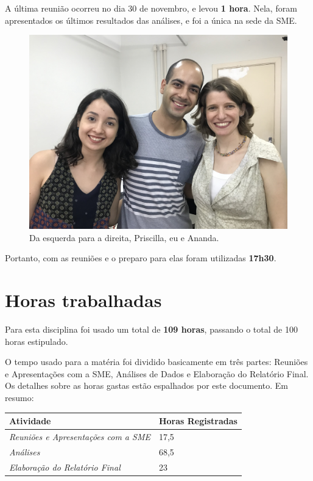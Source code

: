 \documentclass[12pt, a4paper]{article}
\begin{document}
A última reunião ocorreu no dia 30 de novembro, e levou \textbf{1 hora}. Nela, foram apresentados os últimos resultados das análises, e foi a única na sede da SME.

\begin{figure}[H]
	\centering
	\includegraphics[width=0.7\linewidth]{IMG_6634}
	\caption{Da esquerda para a direita, Priscilla, eu e Ananda.}
	\label{fig:img6634}
\end{figure}

Portanto, com as reuniões e o preparo para elas foram utilizadas \textbf{17h30}.

\section{Horas trabalhadas}

Para esta disciplina foi usado um total de \textbf{109 horas}, passando o total de 100 horas estipulado.

O tempo usado para a matéria foi dividido basicamente em três partes: Reuniões e Apresentações com a SME, Análises de Dados e Elaboração do Relatório Final. Os detalhes sobre as horas gastas estão espalhados por este documento. Em resumo:

\begin{table}[H]
	\centering
	\begin{tabular}{l|l}
		\textbf{Atividade}                                   & \textbf{Horas Registradas} \\ \hline
		\textit{Reuniões e Apresentações com a SME} & 17,5                          \\ \hline
		\textit{Análises}                           & 68,5                         \\ \hline
		\textit{Elaboração do Relatório Final}    & 23                         \\ 
	\end{tabular}
\end{table}
\end{document}

